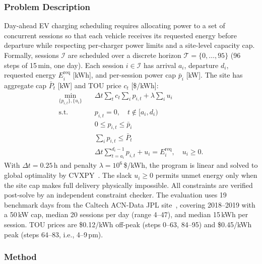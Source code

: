 \documentclass[journal,onecolumn]{IEEEtran} %
\begin{document}

\subsubsection*{\textbf{Problem Description}}
 Day-ahead EV charging scheduling requires allocating power to a set of concurrent sessions so that each vehicle receives its requested energy before departure while respecting per-charger power limits and a site-level capacity cap. Formally, sessions $\mathcal{I}$ are scheduled over a discrete horizon $\mathcal{T} = \{0,\ldots,95\}$ (96 steps of 15\,min, one day). Each session $i \in \mathcal{I}$ has arrival $a_i$, departure $d_i$, requested energy $E_i^{\mathrm{req}}$ [kWh], and per-session power cap $\bar{p}_i$ [kW]. The site has aggregate cap $\bar{P}_t$ [kW] and TOU price $c_t$ [\$/kWh]:
 \begin{align}
 \min_{\{p_{i,t}\},\{u_i\}} \quad &
     \Delta t \sum_t c_t \sum_i p_{i,t}
     + \lambda \sum_i u_i \label{eq:ev_obj}\\
 \text{s.t.}\quad
 & p_{i,t} = 0, \quad t \notin [a_i, d_i) \label{eq:ev_avail}\\
 & 0 \le p_{i,t} \le \bar{p}_i \label{eq:ev_power}\\
 & \textstyle\sum_i p_{i,t} \le \bar{P}_t \label{eq:ev_cap}\\
 & \Delta t \textstyle\sum_{t=a_i}^{d_i-1} p_{i,t} + u_i
     = E_i^{\mathrm{req}}, \quad u_i \ge 0. \label{eq:ev_energy}
 \end{align} 
 With $\Delta t = 0.25$\,h and penalty $\lambda = 10^6$\,\$/kWh, the program is linear and solved to global optimality by CVXPY~\cite{diamond2016cvxpy}. The slack $u_i \ge 0$ permits unmet energy only when the site cap makes full delivery physically impossible. All constraints are verified post-solve by an independent constraint checker.
 The evaluation uses 19 benchmark days from the Caltech ACN-Data JPL site~\cite{lee2019acndata}, covering 2018--2019 with a 50\,kW cap, median 20 sessions per day (range 4--47), and median 15\,kWh per session. TOU prices are \$0.12/kWh off-peak (steps 0--63, 84--95) and \$0.45/kWh peak (steps 64--83, i.e., 4--9\,pm).

 \subsubsection*{\textbf{Method}}
\end{document}
